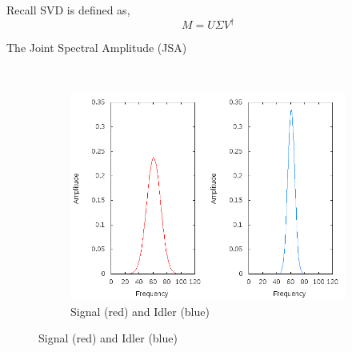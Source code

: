 \documentclass{beamer}
\begin{document}
\begin{frame}
    Recall SVD is defined as,
    \begin{equation}
    M=U \Sigma V^\dagger 
    \end{equation}
\end{frame}

\begin{frame}{The Joint Spectral Amplitude (JSA)} 
    \begin{figure}
        \centering
        \begin{subfigure}{0.45\textwidth}
        \end{subfigure}
        ~
        \begin{subfigure}{0.45\textwidth}
        \includegraphics[width=1\textwidth]{single_sig_idler1.png}
        \caption{Signal (red) and Idler (blue)}
        \end{subfigure}
    \end{figure}

\end{frame} 
\end{document}
